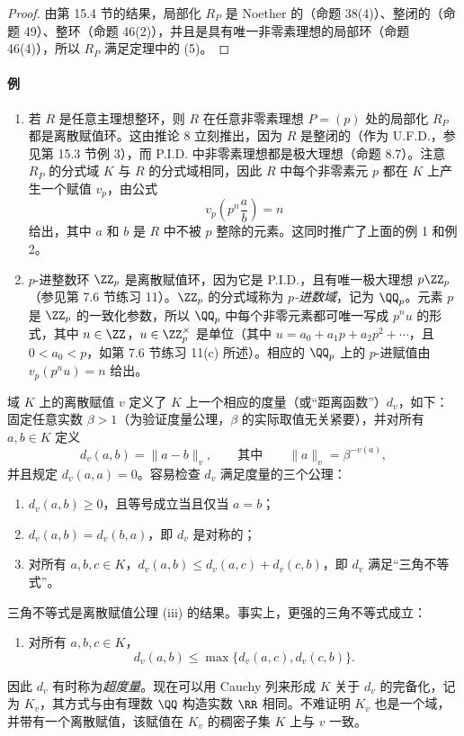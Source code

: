 \begin{proof}
由第 15.4 节的结果，局部化 $R_P$ 是 Noether 的（命题 38(4)）、整闭的（命题 49）、整环（命题 46(2)），并且是具有唯一非零素理想的局部环（命题 46(4)），所以 $R_P$ 满足定理中的 (5)。
\end{proof}

\paragraph{例}
\begin{enumerate}[label=(\arabic*)]
  \item 若 $R$ 是任意主理想整环，则 $R$ 在任意非零素理想 $P=(p)$ 处的局部化 $R_P$ 都是离散赋值环。这由推论 8 立刻推出，因为 $R$ 是整闭的（作为 U.F.D.，参见第 15.3 节例 3），而 P.I.D. 中非零素理想都是极大理想（命题 8.7）。注意 $R_P$ 的分式域 $K$ 与 $R$ 的分式域相同，因此 $R$ 中每个非零素元 $p$ 都在 $K$ 上产生一个赋值 $v_p$，由公式
  \[
    v_p\left(p^n\frac ab\right)=n
  \]
  给出，其中 $a$ 和 $b$ 是 $R$ 中不被 $p$ 整除的元素。这同时推广了上面的例 1 和例 2。

  \item $p$-进整数环 $\ZZ_p$ 是离散赋值环，因为它是 P.I.D.，且有唯一极大理想 $p\ZZ_p$（参见第 7.6 节练习 11）。$\ZZ_p$ 的分式域称为 \emph{$p$-进数域}，记为 $\QQ_p$。元素 $p$ 是 $\ZZ_p$ 的一致化参数，所以 $\QQ_p$ 中每个非零元素都可唯一写成 $p^nu$ 的形式，其中 $n\in\ZZ$，$u\in\ZZ_p^\times$ 是单位（其中 $u=a_0+a_1p+a_2p^2+
  \cdots$，且 $0<a_0<p$，如第 7.6 节练习 11(c) 所述）。相应的 $\QQ_p$ 上的 $p$-进赋值由 $v_p(p^nu)=n$ 给出。
\end{enumerate}

域 $K$ 上的离散赋值 $v$ 定义了 $K$ 上一个相应的度量（或“距离函数”）$d_v$，如下：固定任意实数 $\beta>1$（为验证度量公理，$\beta$ 的实际取值无关紧要），并对所有 $a,b\in K$ 定义
\[
  d_v(a,b)=\lVert a-b\rVert_v,
  \qquad \text{其中}\qquad
  \lVert a\rVert_v=\beta^{-v(a)},
\]
并且规定 $d_v(a,a)=0$。容易检查 $d_v$ 满足度量的三个公理：
\begin{enumerate}[label=(\roman*)]
  \item $d_v(a,b)\geq0$，且等号成立当且仅当 $a=b$；
  \item $d_v(a,b)=d_v(b,a)$，即 $d_v$ 是对称的；
  \item 对所有 $a,b,c\in K$，$d_v(a,b)\leq d_v(a,c)+d_v(c,b)$，即 $d_v$ 满足“三角不等式”。
\end{enumerate}
三角不等式是离散赋值公理 (iii) 的结果。事实上，更强的三角不等式成立：
\begin{enumerate}[label=(\roman*)]
  \item[(iii)$'$] 对所有 $a,b,c\in K$，
  \[
    d_v(a,b)\leq\max\{d_v(a,c),d_v(c,b)\}.
  \]
\end{enumerate}
因此 $d_v$ 有时称为\emph{超度量}。现在可以用 Cauchy 列来形成 $K$ 关于 $d_v$ 的完备化，记为 $K_v$，其方式与由有理数 $\QQ$ 构造实数 $\RR$ 相同。不难证明 $K_v$ 也是一个域，并带有一个离散赋值，该赋值在 $K_v$ 的稠密子集 $K$ 上与 $v$ 一致。

